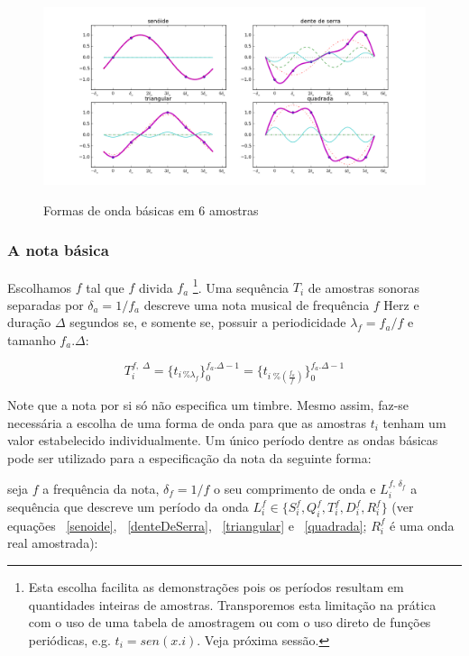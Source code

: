 \begin{figure}[h!]
    \centering
    \caption{Formas de onda básicas em 6 amostras}
        \includegraphics[width=\textwidth]{figuras/amostras6formas___}
        \label{fig:formas6}
\end{figure}

\subsubsection{A nota básica}\label{notaBasica}

Escolhamos $f$ tal que $f$ divida $f_a$  
 \footnote{Esta escolha facilita as demonstrações pois os períodos resultam em quantidades inteiras de amostras. Transporemos esta limitação na prática com o uso de uma tabela de amostragem ou com o uso direto de funções periódicas, e.g. $t_i=sen(x.i)$. Veja próxima sessão.}. 
Uma sequência $T_i$ de amostras sonoras separadas por $\delta_a=1/f_a$ descreve uma nota musical de frequência $f$ Herz e duração $\Delta$ segundos se, e somente se, possuir a periodicidade $\lambda_f=f_a/f$ e tamanho $f_a . \Delta$:

\begin{equation}
T_i^{f,\; \Delta}=\{t_{i \, \% \lambda_f} \}_0^{f_a . \Delta-1}=\{t_{i \; \% \left( \frac{f_a}{f} \right) } \}_0^{f_a . \Delta-1}
\end{equation}

Note que a nota por si só não especifica um timbre. Mesmo assim, faz-se necessária a escolha de uma forma de onda para que as amostras $t_i$ tenham um valor estabelecido individualmente. Um único período dentre as ondas básicas pode ser utilizado para a especificação da nota da seguinte forma:

seja $f$ a frequência da nota, $\delta_f=1/f$ o seu comprimento de onda e $L_i^{f,\, \delta_f} $ a sequência que descreve um período da onda $L_i^f \in \{S_i^f,Q_i^f,T_i^f,D_i^f,R_i^f \}$ (ver equações ~\ref{senoide}, ~\ref{denteDeSerra}, ~\ref{triangular} e ~\ref{quadrada}; $R_i^f$ é uma onda real amostrada):

